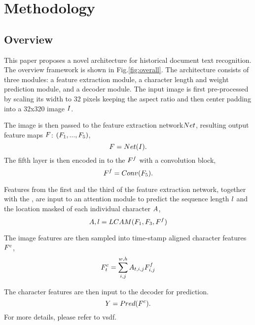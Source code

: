 
\section{Methodology}

\subsection{Overview}

This paper proposes a novel architecture for historical document text recognition. The overview framework is shown in Fig.\ref{fig:overall}. The architecture consists of three modules: a feature extraction module, a character length and weight prediction module, and a decoder module. The input image is first pre-processed by scaling its width to 32 pixels keeping the aspect ratio and then center padding into a 32x320 image $I$. 

The image is then passed to the feature extraction network$Net$, resulting output feature maps $F$: $(F_{{1}}, ... ,F_{{5}})$, 
\begin{equation}
    F=Net(I).
\end{equation}
The fifth layer is then encoded in to the \Tefinalfeat{} $F^f{}$ with a convolution block,
\begin{equation}
    F^f=Conv(F_{{5}}).
\end{equation}

Features from the first and the third of the feature extraction network, together with the \Tefinalfeat{}, are input to an attention module to predict the sequence length $l$ and the location masked of each individual character $A$,
\begin{equation}
    A,l=LCAM(F_{{1}}, F_{{3}}, F^f{})
\end{equation}

The image features are then sampled into time-stamp aligned character features $F^{c}$, 
\begin{equation}
    F^{c}_{{t}}=\sum_{i,j}^{w,h} A_{t,i,j}F^f_{i,j}
\end{equation}

The character features are then input to the decoder for prediction. 
\begin{equation}
    Y=Pred(F^{c}).
\end{equation}
For more details, please refer to vsdf\cite{vsdf}.


